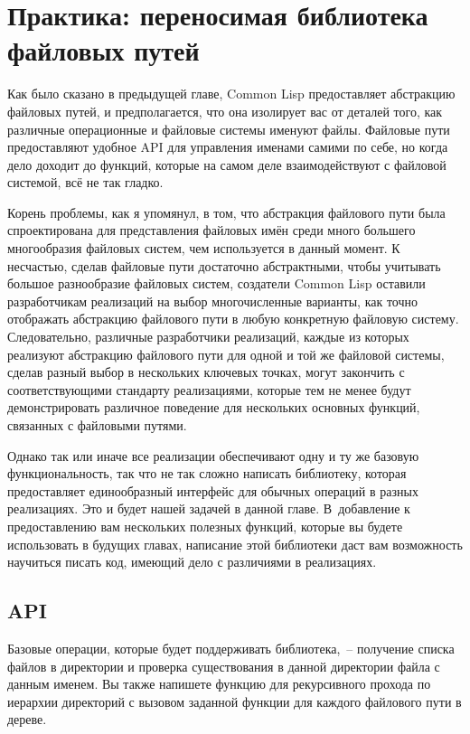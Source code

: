 \chapter{Практика: переносимая библиотека файловых путей}
\label{ch:15}

\thispagestyle{empty}

Как было сказано в предыдущей главе, Common Lisp предоставляет абстракцию файловых путей,
и предполагается, что она изолирует вас от деталей того, как различные операционные и
файловые системы именуют файлы. Файловые пути предоставляют удобное API для управления
именами самими по себе, но когда дело доходит до функций, которые на самом деле
взаимодействуют с файловой системой, всё не так гладко.

Корень проблемы, как я упомянул, в том, что абстракция файлового пути была спроектирована
для представления файловых имён среди много большего многообразия файловых систем, чем
используется в данный момент. К несчастью, сделав файловые пути достаточно абстрактными,
чтобы учитывать большое разнообразие файловых систем, создатели Common Lisp оставили
разработчикам реализаций на выбор многочисленные варианты, как точно отображать абстракцию
файлового пути в любую конкретную файловую систему. Следовательно, различные разработчики
реализаций, каждые из которых реализуют абстракцию файлового пути для одной и той же
файловой системы, сделав разный выбор в нескольких ключевых точках, могут закончить с
соответствующими стандарту реализациями, которые тем не менее будут демонстрировать
различное поведение для нескольких основных функций, связанных с файловыми путями.

Однако так или иначе все реализации обеспечивают одну и ту же базовую функциональность,
так что не так сложно написать библиотеку, которая предоставляет единообразный интерфейс
для обычных операций в разных реализациях. Это и будет нашей задачей в данной главе.
В~добавление к предоставлению вам нескольких полезных функций, которые вы будете
использовать в будущих главах, написание этой библиотеки даст вам возможность научиться
писать код, имеющий дело с различиями в реализациях.

\section{API}

Базовые операции, которые будет поддерживать библиотека,~-- получение списка файлов в
директории и проверка существования в данной директории файла с данным именем. Вы также
напишете функцию для рекурсивного прохода по иерархии директорий с вызовом заданной
функции для каждого файлового пути в дереве.

